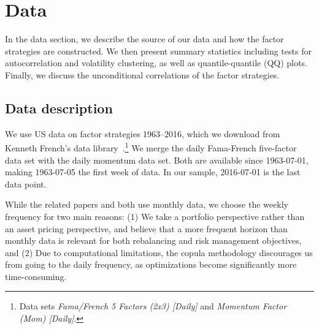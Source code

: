 \section{Data}
\label{sec:data}
In the data section, we describe the source of our data and how the factor strategies are constructed. We then present summary statistics including tests for autocorrelation and volatility clustering, as well as quantile-quantile (QQ) plots. Finally, we discuss the unconditional correlations of the factor strategies.

\subsection{Data description}

We use US data on factor strategies 1963--2016, which we download from Kenneth French's data library~\autocite{FrenchData}.\footnote{Data sets \textit{Fama/French 5 Factors (2x3) [Daily]} and \textit{Momentum Factor (Mom) [Daily]}.} We merge the daily Fama-French five-factor data set with the daily momentum data set. Both are available since 1963-07-01, making 1963-07-05 the first week of data. In our sample, 2016-07-01 is the last data point. 

While the related papers \textcite{FF2015} and \textcite{Asness2015} both use monthly data, we choose the weekly frequency for two main reasons: (1) We take a portfolio perspective rather than an asset pricing perspective, and believe that a more frequent horizon than monthly data is relevant for both rebalancing and risk management objectives, and (2) Due to computational limitations, the copula methodology discourages us from going to the daily frequency, as optimizations become significantly more time-consuming.

